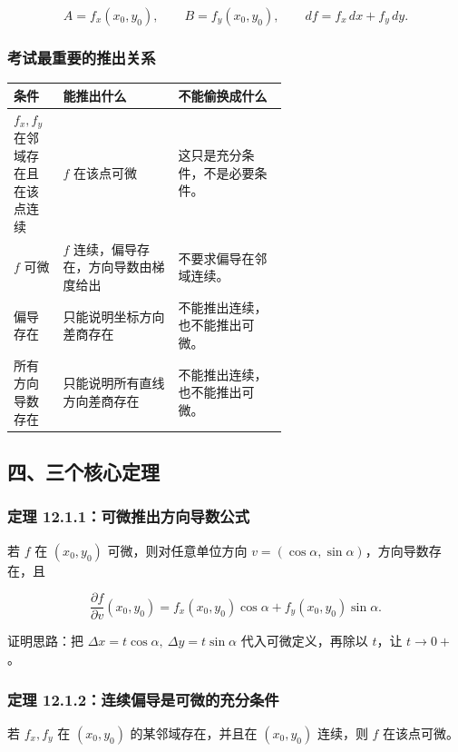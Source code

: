 \[
      A=f_x(x_0,y_0),\qquad B=f_y(x_0,y_0),\qquad
      df=f_x\,dx+f_y\,dy.
    \]

\subsubsection*{考试最重要的推出关系}

\begin{center}
\small
\begin{tabularx}{\linewidth}{|>{\raggedright\arraybackslash}p{0.18\linewidth}|>{\raggedright\arraybackslash}p{0.42\linewidth}|>{\raggedright\arraybackslash}X|}
\hline
\textbf{条件} & \textbf{能推出什么} & \textbf{不能偷换成什么} \\ \hline
\(f_x,f_y\) 在邻域存在且在该点连续 & \(f\) 在该点可微 & 这只是充分条件，不是必要条件。 \\ \hline
\(f\) 可微 & \(f\) 连续，偏导存在，方向导数由梯度给出 & 不要求偏导在邻域连续。 \\ \hline
偏导存在 & 只能说明坐标方向差商存在 & 不能推出连续，也不能推出可微。 \\ \hline
所有方向导数存在 & 只能说明所有直线方向差商存在 & 不能推出连续，也不能推出可微。 \\ \hline
\end{tabularx}
\end{center}

\subsection*{四、三个核心定理}

\subsubsection*{定理 12.1.1：可微推出方向导数公式}

若 \(f\) 在 \((x_0,y_0)\) 可微，则对任意单位方向 \(v=(\cos\alpha,\sin\alpha)\)，方向导数存在，且

\[
      \frac{\partial f}{\partial v}(x_0,y_0)
      =f_x(x_0,y_0)\cos\alpha+f_y(x_0,y_0)\sin\alpha.
    \]

证明思路：把 \(\Delta x=t\cos\alpha,\ \Delta y=t\sin\alpha\) 代入可微定义，再除以 \(t\)，让 \(t\to0+\)。

\subsubsection*{定理 12.1.2：连续偏导是可微的充分条件}

若 \(f_x,f_y\) 在 \((x_0,y_0)\) 的某邻域存在，并且在 \((x_0,y_0)\) 连续，则 \(f\) 在该点可微。

